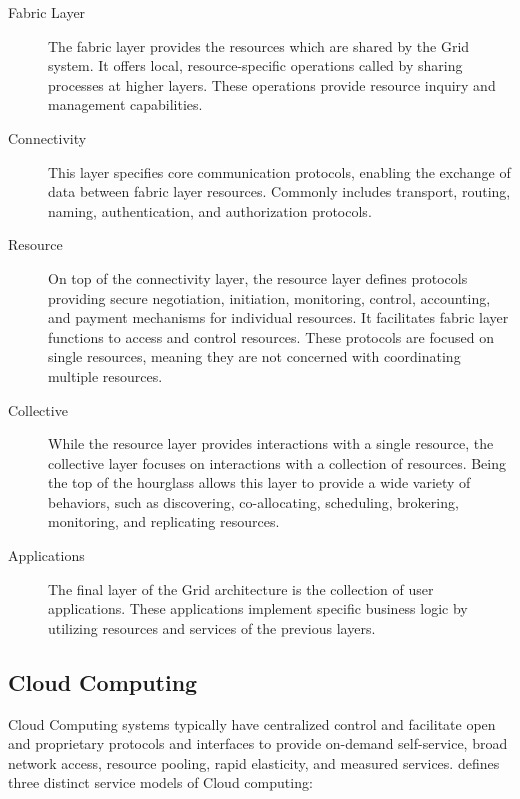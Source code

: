 \begin{description}
  \item[Fabric Layer]
    The fabric layer provides the resources which are shared by the Grid system.
    It offers local, resource-specific operations called by sharing processes at
    higher layers. These operations provide resource inquiry and management
    capabilities.

  \item[Connectivity]
    This layer specifies core communication protocols, enabling the exchange of
    data between fabric layer resources. Commonly includes transport, routing,
    naming, authentication, and authorization protocols.

  \item[Resource]
    On top of the connectivity layer, the resource layer defines protocols
    providing secure negotiation, initiation, monitoring, control, accounting,
    and payment mechanisms for individual resources. It facilitates fabric layer
    functions to access and control resources. These protocols are focused on
    single resources, meaning they are not concerned with coordinating multiple
    resources.

  \item[Collective]
    While the resource layer provides interactions with a single resource, the
    collective layer focuses on interactions with a collection of resources.
    Being the top of the hourglass allows this layer to provide a wide variety
    of behaviors, such as discovering, co-allocating, scheduling, brokering,
    monitoring, and replicating resources.

  \item[Applications]
    The final layer of the Grid architecture is the collection of user
    applications. These applications implement specific business logic by
    utilizing resources and services of the previous layers.
\end{description}

\subsection{Cloud Computing}

Cloud Computing systems typically have centralized control and facilitate open
and proprietary protocols and interfaces to provide on-demand self-service,
broad network access, resource pooling, rapid elasticity, and measured services.
 \cite{mell2011} defines three distinct service models of
Cloud computing:

